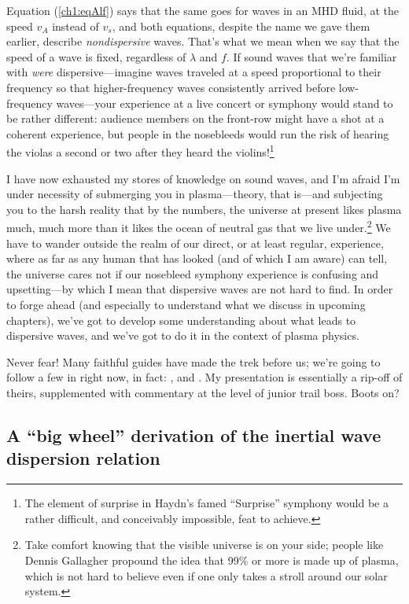 Equation (\ref{ch1:eqAlf}) says that the same goes for waves in an MHD
fluid, at the speed $v_A$ instead of $v_s$, and both equations,
despite the name we gave them earlier, describe \emph{nondispersive}
waves. That's what we mean when we say that the speed of a wave is
fixed, regardless of $\lambda$ and $f$. If sound waves that we're
familiar with \emph{were} dispersive---imagine waves traveled at a
speed proportional to their frequency so that higher-frequency waves
consistently arrived before low-frequency waves---your experience at a
live concert or symphony would stand to be rather different: audience
members on the front-row might have a shot at a coherent experience,
but people in the nosebleeds would run the risk of hearing the violas
a second or two after they heard the violins!\footnote{The element of
  surprise in Haydn's famed ``Surprise'' symphony would be a rather
  difficult, and conceivably impossible, feat to achieve.}

I have now exhausted my stores of knowledge on sound waves, and I'm
afraid I'm under necessity of submerging you in plasma---theory, that
is---and subjecting you to the harsh reality that by the numbers, the
universe at present likes plasma much, much more than it likes the
ocean of neutral gas that we live under.\footnote{Take comfort knowing
  that the visible universe is on your side; people like Dennis
  Gallagher propound the idea that 99\% or more is made up of plasma,
  which is not hard to believe even if one only takes a stroll around
  our solar system.} We have to wander outside the realm of our
direct, or at least regular, experience, where as far as any human
that has looked (and of which I am aware) can tell, the universe cares
not if our nosebleed symphony experience is confusing and
upsetting---by which I mean that dispersive waves are not hard to
find. In order to forge ahead (and especially to understand what we
discuss in upcoming chapters), we've got to develop some understanding
about what leads to dispersive waves, and we've got to do it in the
context of plasma physics.

Never fear! Many faithful guides have made the trek before us; we're
going to follow a few in right now, in fact: \citet{Goertz1979}, and
\citet{Kletzing1994}. My presentation is essentially a rip-off of
theirs, supplemented with commentary at the level of junior trail
boss. Boots on?

\subsection[A ``big wheel'' derivation of the IAW dispersion
relation]{A ``big wheel'' derivation of the inertial \Alf wave dispersion
  relation}

